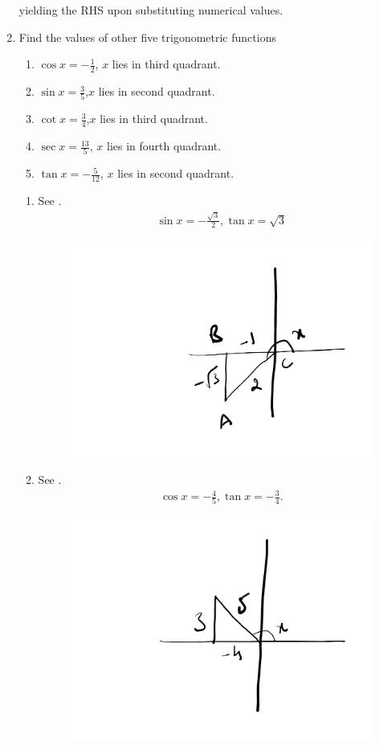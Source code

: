 \begin{enumerate}[label=\thesubsection.\arabic*,ref=\thesubsection.\theenumi,itemsep=1ex]
yielding the RHS upon substituting numerical values.
\item Find the values of other five trigonometric functions 
\begin{enumerate}
	\item $\cos x=-\frac{1}{2}$, $x$  lies in third quadrant.
	\item $\sin x= \frac{3}{5} $,$ x$  lies in second quadrant.
	\item $\cot x= \frac{3}{4}$,$ x$  lies in third quadrant.
	\item $\sec x= \frac{13}{5}$, $x$  lies in fourth quadrant.
	\item $\tan x=-\frac{5}{12}$, $x$  lies in second quadrant.
\end{enumerate}
%
\solution
\begin{enumerate}
	\item 
	See .	
\begin{align}
	\sin x = -\frac{\sqrt{3}}{2},
	\tan x = {\sqrt{3}}
\end{align}
\begin{figure}[H]
	\begin{center}
		{\includegraphics[width=0.6\columnwidth]{figs/ncert/id/4.png}}
	\end{center}
	\caption{}
	\label{fig:ncert-id-4}	
\end{figure}
	\item 
	See .	
\begin{align}
	\cos x = -\frac{4}{5},
	\tan x = -\frac{3}{4}.
\end{align}
\begin{figure}[H]
	\begin{center}
		{\includegraphics[width=0.6\columnwidth]{figs/ncert/id/5.png}}

\end{center}
\end{figure}
\end{enumerate}
\end{enumerate}
